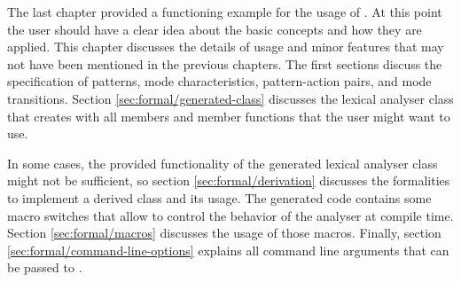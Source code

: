 The last chapter provided a functioning example for the usage of {\quex}.  At
this point the user should have a clear idea about the basic concepts and how
they are applied. This chapter discusses the details of usage and minor
features that may not have been mentioned in the previous chapters. The first
sections discuss the specification of patterns, mode characteristics,
pattern-action pairs, and mode transitions. Section
\ref{sec:formal/generated-class} discusses the lexical analyser class that
{\quex} creates with all members and member functions that the user might want
to use.

In some cases, the provided functionality of the generated lexical analyser
class might not be sufficient, so section \ref{sec:formal/derivation}
discusses the formalities to implement a derived class and its usage. The
generated code contains some macro switches that allow to control the behavior of
the analyser at compile time. Section \ref{sec:formal/macros} discusses the
usage of those macros. Finally, section \ref{sec:formal/command-line-options}
explains all command line arguments that can be passed to {\quex}.

